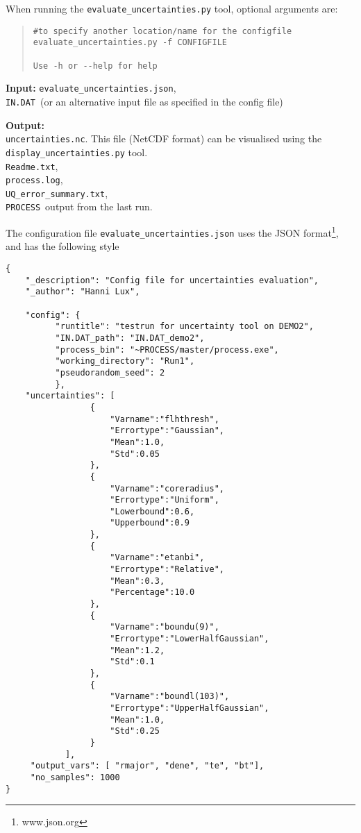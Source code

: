 \documentclass[11pt,a4paper]{article}
\newcommand{\indat}{\mbox{\texttt{IN.DAT}}}
\newcommand{\process}{\mbox{\texttt{PROCESS}}}
\begin{document}
When running the \texttt{evaluate\_uncertainties.py} tool, optional arguments are:
\begin{quote}
\begin{verbatim}
#to specify another location/name for the configfile
evaluate_uncertainties.py -f CONFIGFILE

Use -h or --help for help
\end{verbatim}
\end{quote}



\begin{description}
\item{\textbf{Input:}} \texttt{evaluate\_uncertainties.json},\\
\indat\ (or an alternative input file as specified in the config file)

\item{\textbf{Output:}} \\
\texttt{uncertainties.nc}. This file (NetCDF format) can be visualised using the \texttt{display\_uncertainties.py} tool. \\
\texttt{Readme.txt},\\
\texttt{process.log}, \\
\texttt{UQ\_error\_summary.txt},\\
\process\ output from the last run.

\end{description}
The configuration file \texttt{evaluate\_uncertainties.json} uses the JSON
format\footnote{www.json.org}, and has the following style
\begin{framed}
\begin{verbatim}
{
	"_description": "Config file for uncertainties evaluation",
	"_author": "Hanni Lux",

	"config": {
		  "runtitle": "testrun for uncertainty tool on DEMO2",
		  "IN.DAT_path": "IN.DAT_demo2",
		  "process_bin": "~PROCESS/master/process.exe",
		  "working_directory": "Run1",
		  "pseudorandom_seed": 2
		  },
	"uncertainties": [
          	     {
               	     "Varname":"flhthresh",
               	     "Errortype":"Gaussian",
               	     "Mean":1.0,
               	     "Std":0.05
          	     },
          	     {
               	     "Varname":"coreradius",
               	     "Errortype":"Uniform",
               	     "Lowerbound":0.6,
               	     "Upperbound":0.9
          	     },
          	     {
               	     "Varname":"etanbi",
               	     "Errortype":"Relative",
               	     "Mean":0.3,
               	     "Percentage":10.0
          	     },
          	     {
               	     "Varname":"boundu(9)",
               	     "Errortype":"LowerHalfGaussian",
               	     "Mean":1.2,
               	     "Std":0.1
          	     },
          	     {
               	     "Varname":"boundl(103)",
               	     "Errortype":"UpperHalfGaussian",
               	     "Mean":1.0,
               	     "Std":0.25
          	     }
	     	],
     "output_vars": [ "rmajor", "dene", "te", "bt"],
     "no_samples": 1000
}
\end{verbatim}
\end{framed}
\end{document}

